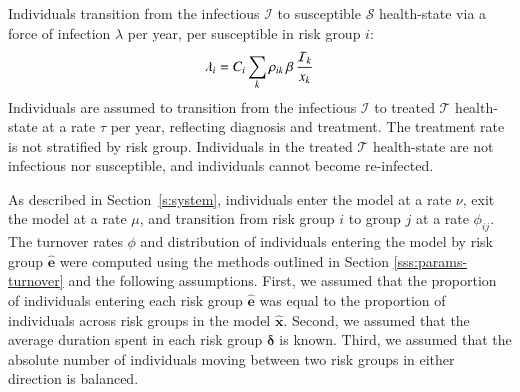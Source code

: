 Individuals transition from the
infectious $\mathcal{I}$ to susceptible $\mathcal{S}$ health-state
via a force of infection $\lambda$ per year, per susceptible in risk group $i$:
\begin{equation}
  \lambda_{i} =
  C_{i} \sum_k \rho_{ik} \thinspace  \beta \thinspace \frac{\mathcal{I}_k}{x_k}
  \label{eq:foi}
\end{equation}
Individuals are assumed to transition from the
infectious $\mathcal{I}$ to treated $\mathcal{T}$ health-state
at a rate $\tau$ per year, reflecting diagnosis and treatment.
The treatment rate is not stratified by risk group.
Individuals in the treated $\mathcal{T}$ health-state are not infectious nor susceptible,
and individuals cannot become re-infected.
\par
As described in Section~\ref{s:system}, individuals
enter the model at a rate $\nu$,
exit the model at a rate $\mu$,
and transition from risk group $i$ to group $j$ at a rate $\phi_{ij}$.
The turnover rates $\phi$ and
distribution of individuals entering the model by risk group $\bm{\hat{e}}$
were computed using the methods outlined in
Section \ref{sss:params-turnover}
and the following assumptions.
First, we assumed that
the proportion of individuals entering each risk group $\bm{\hat{e}}$
was equal to the proportion of individuals across risk groups in the model $\bm{\hat{x}}$.
Second, we assumed that
the average duration spent in each risk group $\bm{\delta}$ is known.
Third, we assumed that
the absolute number of individuals moving between two risk groups in either direction is balanced.

